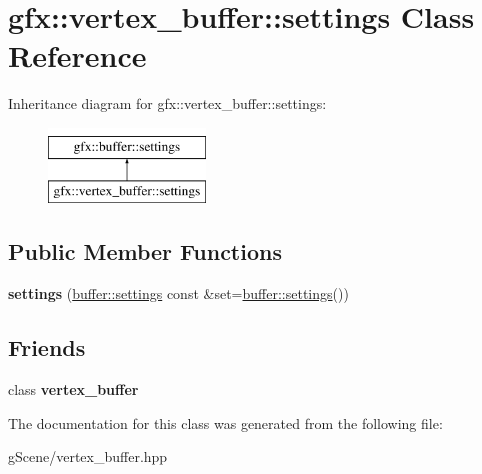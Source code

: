 \hypertarget{classgfx_1_1vertex__buffer_1_1settings}{\section{gfx\-:\-:vertex\-\_\-buffer\-:\-:settings Class Reference}
\label{classgfx_1_1vertex__buffer_1_1settings}
}
Inheritance diagram for gfx\-:\-:vertex\-\_\-buffer\-:\-:settings\-:\begin{figure}[H]
\begin{center}
\leavevmode
\includegraphics[height=2.000000cm]{classgfx_1_1vertex__buffer_1_1settings}
\end{center}
\end{figure}
\subsection*{Public Member Functions}
\begin{DoxyCompactItemize}
\item 
\hypertarget{classgfx_1_1vertex__buffer_1_1settings_a6633e9e11ec4317c6019830aa9cbe7c7}{{\bfseries settings} (\hyperlink{classgfx_1_1buffer_1_1settings}{buffer\-::settings} const \&set=\hyperlink{classgfx_1_1buffer_1_1settings}{buffer\-::settings}())}\label{classgfx_1_1vertex__buffer_1_1settings_a6633e9e11ec4317c6019830aa9cbe7c7}

\end{DoxyCompactItemize}
\subsection*{Friends}
\begin{DoxyCompactItemize}
\item 
\hypertarget{classgfx_1_1vertex__buffer_1_1settings_a80c036901d113d3fa4314fcc7317646c}{class {\bfseries vertex\-\_\-buffer}}\label{classgfx_1_1vertex__buffer_1_1settings_a80c036901d113d3fa4314fcc7317646c}

\end{DoxyCompactItemize}


The documentation for this class was generated from the following file\-:\begin{DoxyCompactItemize}
\item 
g\-Scene/vertex\-\_\-buffer.\-hpp\end{DoxyCompactItemize}
